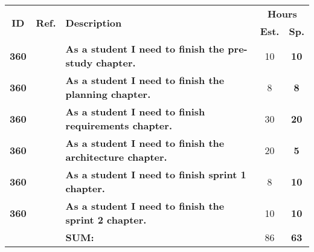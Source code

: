 \label{tab:sprint2Documentationstories}
\def\arraystretch{1.25}
 
\begin{longtable}{ccXcc}

\toprule[0.5mm]
\multirow{2}{*}{\textbf{ID}} &
\multirow{2}{*}{\textbf{Ref.}} & \multirow{2}{*}{\textbf{Description}} & \multicolumn{2}{c}{\textbf{Hours}} \\
 					& & & \textbf{Est.} & \textbf{Sp.} \\
\midrule


\textbf{360} 	& 	& {\bf As a student I need to finish the pre-study chapter.} 									& 	10	& \textbf{ 10} \\

\textbf{360} 	& 	& {\bf As a student I need to finish the planning chapter.} 									& 	8	& \textbf{ 8} \\

\textbf{360} 	& 	& {\bf As a student I need to finish requirements chapter.} 									& 	30	& \textbf{ 20} \\

\textbf{360} 	&   & {\bf As a student I need to finish the architecture chapter.} 								& 	20	& \textbf{ 5} \\

\textbf{360} 	& 	& {\bf As a student I need to finish sprint 1 chapter.} 										& 	8	& \textbf{ 10} \\

\textbf{360} 	& 	& {\bf As a student I need to finish the  sprint 2 chapter.} 									& 	10	& \textbf{ 10} \\

								
\hline
				&& \textbf{SUM:}		&		86	& \textbf{63}
 \\																			
\bottomrule[0.5mm]
\end{longtable}
